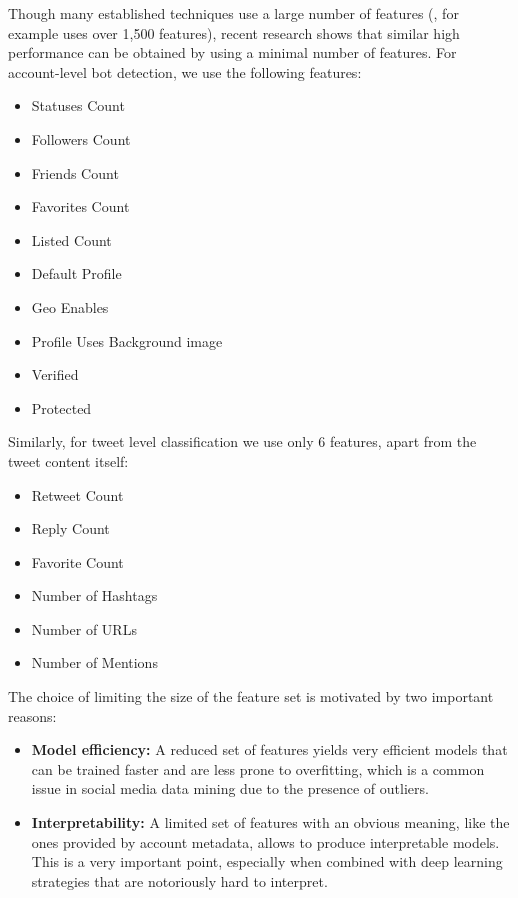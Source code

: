 Though many established techniques use a large number of features (\cite{davis2016botornot}, for example uses over 1,500 features), recent research \cite{ferrara2017disinformation,ferrara2016rise} shows that similar high performance can be obtained by using a minimal number of features. For account-level bot detection, we use the following features:
\begin{itemize}
\item Statuses Count
\item Followers Count
\item Friends Count
\item Favorites Count
\item Listed Count
\item Default Profile
\item Geo Enables
\item Profile Uses Background image
\item Verified
\item Protected
\end{itemize}

 Similarly, for tweet level classification we use only 6 features, apart from the tweet content itself:
\begin{itemize}
\item Retweet Count 
\item Reply Count
\item Favorite Count
\item Number of Hashtags
\item Number of URLs
\item Number of Mentions
\end{itemize}

The choice of limiting the size of the feature set is motivated by two important reasons: 

\begin{itemize}
\item \textbf{Model efficiency:} A reduced set of features yields very efficient models that can be trained faster and are less prone to overfitting, which is a common issue in social media data mining due to the presence of outliers.
\item \textbf{Interpretability:} A limited set of features with an obvious meaning, like the ones provided by account metadata, allows to produce interpretable models. This is a very important point, especially when combined with deep learning strategies that are notoriously hard to interpret.
\end{itemize}

